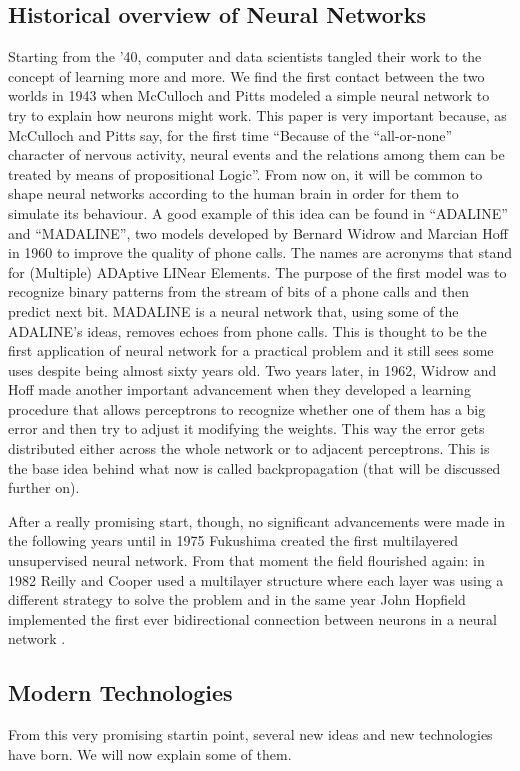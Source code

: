 \documentclass[conference]{IEEEtran}
\begin{document}
	\subsection{Historical overview of Neural Networks}\label{HONN}
	Starting from the '40, computer and data scientists tangled their work to the concept of learning more and more.
	We find the first contact between the two worlds in 1943 when McCulloch and Pitts modeled a simple neural network to try to explain how neurons might work. \cite{f1}
	This paper is very important because, as McCulloch and Pitts say, for the first time ``Because of the ``all-or-none'' character of nervous activity, neural events and the relations among them can be treated by means of propositional Logic''. From now on, it will be common to shape neural networks according to the human brain in order for them to simulate its behaviour.
	A good example of this idea can be found in ``ADALINE'' and ``MADALINE'', two models developed by Bernard Widrow and Marcian Hoff in 1960 to improve the quality of phone calls. The names are acronyms that stand for (Multiple) ADAptive LINear Elements. The purpose of the first model was to recognize binary patterns from the stream of bits of a phone calls and then predict next bit. MADALINE is a neural network that, using some of the ADALINE's ideas, removes echoes from phone calls. This is thought to be the first application of neural network for a practical problem and it still sees some uses despite being almost sixty years old. \cite{f2}
	Two years later, in 1962, Widrow and Hoff made another important advancement when they developed a learning procedure that allows perceptrons to recognize whether one of them has a big error and then try to adjust it modifying the weights. This way the error gets distributed either across the whole network or to adjacent perceptrons. \cite{f3} This is the base idea behind what now is called backpropagation (that will be discussed further on).

	After a really promising start, though, no significant advancements were made in the following years until in 1975 Fukushima created the first multilayered unsupervised neural network.\cite{f4} From that moment the field flourished again: in 1982 Reilly and Cooper used a multilayer structure where each layer was using a different strategy to solve the problem \cite{f5} and in the same year John Hopfield implemented the first ever bidirectional connection between neurons in a neural network \cite{f6}.

	\subsection{Modern Technologies}\label{MT}
	From this very promising startin point, several new ideas and new technologies have born. We will now explain some of them.
\end{document}

